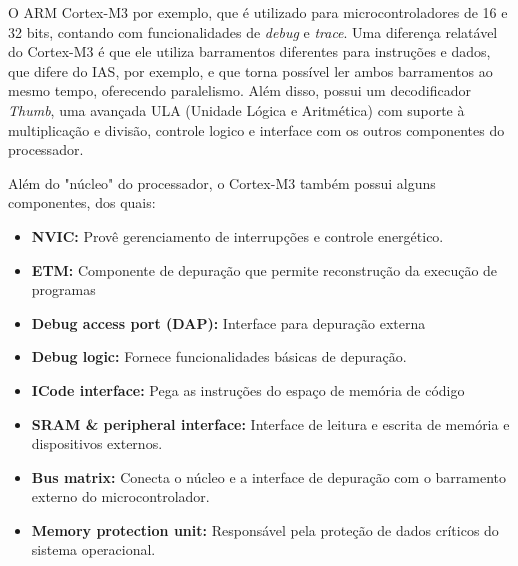 \documentclass{article}
\begin{document}
O ARM Cortex-M3 por exemplo, que é utilizado para microcontroladores de 16 e 32
bits, contando com funcionalidades de \textit{debug} e \textit{trace}. Uma
diferença relatável do Cortex-M3 é que ele utiliza barramentos diferentes para
instruções e dados, que difere do IAS, por exemplo, e que torna possível ler
ambos barramentos ao mesmo tempo, oferecendo paralelismo. Além disso, possui um
decodificador \textit{Thumb}, uma avançada ULA (Unidade Lógica e Aritmética)
com suporte à multiplicação e divisão, controle logico e interface com os outros
componentes do processador.

Além do "núcleo" do processador, o Cortex-M3 também possui alguns componentes,
dos quais:

\begin{itemize}
    \item \textbf{NVIC:} Provê gerenciamento de interrupções e controle
        energético.
    \item \textbf{ETM:} Componente de depuração que permite reconstrução da
        execução de programas
    \item \textbf{Debug access port (DAP):} Interface para depuração externa
    \item \textbf{Debug logic:} Fornece funcionalidades básicas de depuração.
    \item \textbf{ICode interface:} Pega as instruções do espaço de memória de
        código
    \item \textbf{SRAM \& peripheral interface:} Interface de leitura e escrita
        de memória e dispositivos externos.
    \item \textbf{Bus matrix:} Conecta o núcleo e a interface de depuração com
        o barramento externo do microcontrolador.
    \item \textbf{Memory protection unit:} Responsável pela proteção de dados
        críticos do sistema operacional. 
\end{itemize}
\end{document}
